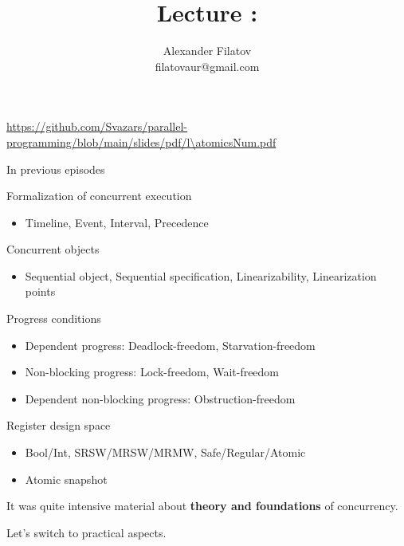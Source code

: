 


\newcommand{\thisLectureNum}{\atomicsNum}

\title[]{Lecture \thisLectureNum: \atomicsTopic}
\subtitle[]{\atomicsKey}
\author[]{Alexander Filatov\\ filatovaur@gmail.com}

\date{}



\begin{frame}
  \titlepage
  \url{https://github.com/Svazars/parallel-programming/blob/main/slides/pdf/l\thisLectureNum.pdf}
\end{frame}


\begin{frame}{In previous episodes}

Formalization of concurrent execution
\begin{itemize}
  \item Timeline, Event, Interval, Precedence
\end{itemize}

Concurrent objects
\begin{itemize}
  \item Sequential object, Sequential specification, Linearizability, Linearization points
\end{itemize}

Progress conditions
\begin{itemize}
  \item Dependent progress: Deadlock-freedom, Starvation-freedom
  \item Non-blocking progress: Lock-freedom, Wait-freedom
  \item Dependent non-blocking progress: Obstruction-freedom
\end{itemize}

Register design space
\begin{itemize}
  \item Bool/Int, SRSW/MRSW/MRMW, Safe/Regular/Atomic
  \item Atomic snapshot
\end{itemize}

\pause

It was quite intensive material about \textbf{theory and foundations} of concurrency.

\pause Let's switch to practical aspects.

\end{frame}


